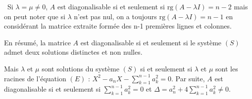 {{\textbullet~Si $\lambda=\mu\neq 0$, $A$ est diagonalisable si et seulement si $\text{rg}(A-\lambda I) = n-2$ mais on peut noter que si $\lambda$ n'est pas nul, on a toujours $\text{rg}(A-\lambda I)= n-1$ en considérant la matrice extraite formée des n-1 premières lignes et colonnes.

En résumé, la matrice $A$ est diagonalisable si et seulement si le système $(S)$ admet deux solutions distinctes et non nulles.

Mais $\lambda$ et $\mu$ sont solutions du système $(S)$ si et seulement si $\lambda$ et $\mu$ sont les racines de l'équation $(E)$ : $X^2 - a_nX- \sum_{k=1}^{n-1}a_k^2 = 0$. Par suite, $A$ est diagonalisable si et seulement si $\sum_{k=1}^{n-1}a_k^2 = 0$ et $\Delta= a_n^2+4\sum_{k=1}^{n-1}a_k^2\neq0$.}
}